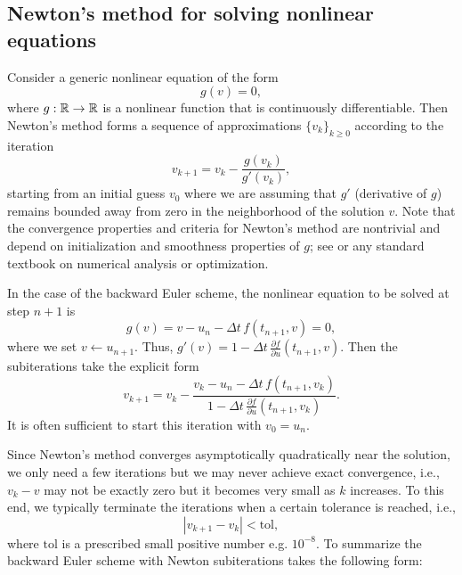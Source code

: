 \subsection{Newton's method for solving nonlinear equations}

Consider a generic nonlinear equation of the form 
\begin{equation*}
    g(v) = 0,
\end{equation*}
where $g: \mathbb{R} \to \mathbb{R}$ is a nonlinear function that is continuously differentiable.
Then Newton's method forms a sequence of approximations $\{v_k\}_{k \ge 0}$ according to the iteration
\begin{equation*}
    v_{k+1} = v_k - \frac{g(v_k)}{g'(v_k)},
\end{equation*}
starting from an initial guess $v_0$ where we are assuming that $g'$ (derivative of $g$)
 remains bounded away from zero in the neighborhood of the solution $v$. Note that 
 the convergence properties and criteria for Newton's method are 
 nontrivial and depend on initialization and smoothness properties 
 of $g$; see \cite[Thm.~3.5]{nocedal2006numerical} or any standard 
 textbook on numerical analysis or optimization.
 
 In the 
 case of the backward Euler scheme, the nonlinear equation to be solved 
 at step $n+1$ is 
\begin{equation*}
    g(v) = v - u_n - \Delta t \, f(t_{n+1}, v) = 0,
\end{equation*}
where we set $v \leftarrow u_{n+1}$. Thus, $g'(v) = 1 - \Delta t \, \frac{\partial f}{\partial u}(t_{n+1}, v)$. Then the subiterations take the explicit form 
\begin{equation*}
    v_{k+1} = v_k - \frac{v_k - u_n - \Delta t \, f(t_{n+1}, v_k)}{1 - \Delta t \, \frac{\partial f}{\partial u}(t_{n+1}, v_k)}.
\end{equation*}
It is often sufficient to start this iteration with $v_0 = u_n$.

Since Newton's method converges asymptotically quadratically near the solution, 
we only need a few iterations but we may never achieve exact convergence, i.e., 
$v_k - v$ may not be exactly zero but it becomes very small as $k$ increases. 
To this end, we typically terminate the iterations when a certain 
tolerance is reached, i.e., 
\begin{equation*}
    |v_{k+1} - v_k| < \text{tol},
\end{equation*}
where $\text{tol}$ is a prescribed small positive number e.g. $10^{-8}$.
To summarize the backward Euler scheme with Newton subiterations takes the 
following form: 


